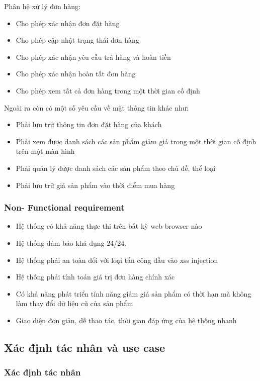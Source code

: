 \documentclass[12pt,a4paper,2sides]{report}
\begin{document}
Phân hệ xử lý đơn hàng:
\begin{itemize}
    \item Cho phép xác nhận đơn đặt hàng
    \item Cho phép cập nhật trạng thái đơn hàng
    \item Cho phép xác nhận yêu cầu trả hàng và hoàn tiền
    \item Cho phép xác nhận hoàn tất đơn hàng
    \item Cho phép xem tất cả đơn hàng trong một thời gian cố định
\end{itemize}
Ngoài ra còn có một số yêu cầu về mặt thông tin khác như:
\begin{itemize}
    \item Phải lưu trữ thông tin đơn đặt hàng của khách
    \item Phải xem được danh sách các sản phẩm giảm giá trong một thời gian cố định trên một màn hình
    \item Phải quản lý được danh sách các sản phẩm theo chủ đề, thể loại
    \item Phải lưu trữ giá sản phẩm vào thời điểm mua hàng 
\end{itemize}
\subsubsection{Non- Functional requirement}
\begin{itemize}
    \item Hệ thống có khả năng thực thi trên bất kỳ web browser nào
    \item Hệ thống đảm bảo khả dụng 24/24.
    \item Hệ thống phải an toàn đối với loại tấn công đầu vào xss injection
    \item Hệ thống phải tính toán giá trị đơn hàng chính xác 
    \item Có khả năng phát triển tính năng giảm giá sản phẩm có thời hạn mà không làm thay đổi dữ liệu cũ của sản phẩm
    \item Giao diện đơn giản, dễ thao tác, thời gian đáp ứng của hệ thống nhanh
\end{itemize}

\subsection{Xác định tác nhân và use case}
\subsubsection{Xác định tác nhân}
\end{document}
